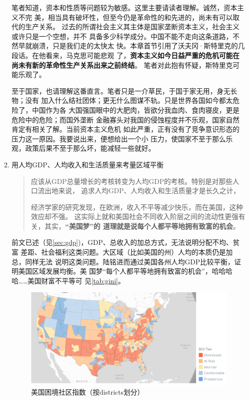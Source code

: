 \begin{enumerate}
  笔者知道，资本和性质等问题较为敏感。这里主要请读者理解。诚然，资本主义不完
  美，相当具有破坏性，但至今仍是革命性的和先进的，尚未有可以取代的生产关系。
  过去的所谓社会主义其主体是国家垄断资本主义，社会主义或许只是一个空想，并不
  具备多少科学成分。中国不能不走向这条道路，不然早就崩溃，只是我们走的太快太
  快。本章首节引用了沃夫冈·斯特里克的几段话。在他看来，马克思可能悲观
  了，\textbf{资本主义如今日益严重的危机可能在尚未有新的革命性生产关系出来之前终结}。
  笔者对此抱有怀疑，斯特里克可能乐观了。

  至于国家，也请理解这番直言。笔者只是一介草民，于国于家无用，身无长物；没有
  加入什么结社团体；更无什么图谋不轨。只是世界各国如今都太危险了，中国作为各
  大国强国眼中的大肥肉，皆欲分我血肉、食肉寝皮，更是危险中的危险；而国外垄断
  金融寡头对我国的侵蚀程度并不乐观，国家自然肯定有相关了解。当前资本主义危机
  如此严重，正有没有了竞争意识形态的压力这一原因。我要说出来，便想给出一个小
  压力，使国家不至于那么乐观，政策后果不至于那么坏，能减轻一些就好。


\item 用人均GDP、人均收入和生活质量来考量区域平衡

  \begin{quotation}
    应该从GDP总量增长的考核转变为人均GDP的考核。特别是对那些人口流出地来说，
    追求人均GDP、人均收入和生活质量才是长久之计，

    经济学家的研究发现，在欧洲，收入不平等减少快乐，而在美国，这种效应却不强。
    这实际上就和美国社会不同收入阶层之间的流动性更强有关，其实，\textbf{“美国梦”的
    道理就是说每个人都平等地拥有致富的机会}。
  \end{quotation}

  前文已述（见\cref{sec:gdp})，GDP、总收入的加总方式，无法说明分配不均、贫富
  差距、社会福利这类问题。大区域（比如美国的州）人均的本质仍是加总，同样无法
  说明这类问题。陆铭进而通过美国各州人均GDP比较平衡，证明美国区域发展均衡。美
  国梦“每个人都平等地拥有致富的机会”，哈哈哈哈……美国财富不平等可
  见\cref{tab:gini}。

\begin{figure}[ht]
  \centering
  \includegraphics[options]{figures/DCIbyDistricts.png}
  \caption{\label{fig:DCIbyD}美国困境社区指数（按districts划分）}
\end{figure}


\end{enumerate}
